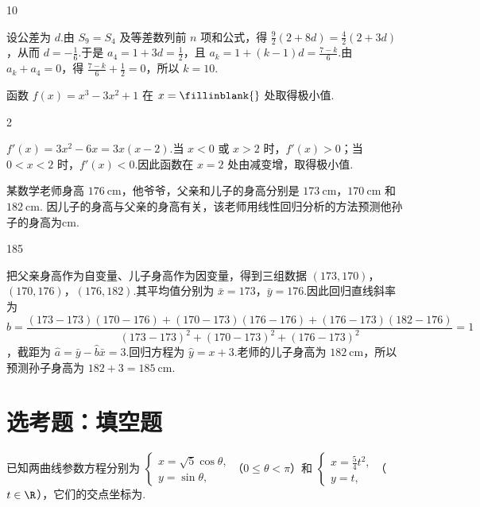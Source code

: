 \begin{answer}
10
\end{answer}

\begin{solution}
设公差为 \(d\).由 \(S_9=S_4\) 及等差数列前 \(n\) 项和公式，得 \(\frac{9}{2}(2+8d)=\frac{4}{2}(2+3d)\)，从而 \(d=-\frac{1}{6}\).于是 \(a_4=1+3d=\frac{1}{2}\)，且 \(a_k=1+(k-1)d=\frac{7-k}{6}\).由 \(a_k+a_4=0\)，得 \(\frac{7-k}{6}+\frac{1}{2}=0\)，所以 \(k=10\).
\end{solution}

\begin{problem}
函数 \( f(x) = x^3 - 3x^2 + 1 \) 在 \( x =\fillinblank{} \) 处取得极小值.
\end{problem}

\begin{answer}
2
\end{answer}

\begin{solution}
\(f'(x)=3x^2-6x=3x(x-2)\).当 \(x<0\) 或 \(x>2\) 时，\(f'(x)>0\)；当 \(0<x<2\) 时，\(f'(x)<0\).因此函数在 \(x=2\) 处由减变增，取得极小值.
\end{solution}

\begin{problem}
某数学老师身高 \(176\mathrm{~cm}\)，他爷爷，父亲和儿子的身高分别是 \(173\mathrm{~cm}\)，\(170\mathrm{~cm}\) 和 \(182\mathrm{~cm}\). 因儿子的身高与父亲的身高有关，该老师用线性回归分析的方法预测他孙子的身高为\fillinblank{}\(\mathrm{cm}\).
\end{problem}

\begin{answer}
185
\end{answer}

\begin{solution}
把父亲身高作为自变量、儿子身高作为因变量，得到三组数据 \((173,170)\)，\((170,176)\)，\((176,182)\).其平均值分别为 \(\bar x=173\)，\(\bar y=176\).因此回归直线斜率为
\(\hat b=\dfrac{(173-173)(170-176)+(170-173)(176-176)+(176-173)(182-176)}{(173-173)^2+(170-173)^2+(176-173)^2}=1\)，截距为 \(\hat a=\bar y-\hat b\bar x=3\).回归方程为 \(\hat y=x+3\).老师的儿子身高为 \(182\mathrm{~cm}\)，所以预测孙子身高为 \(182+3=185\mathrm{~cm}\).
\end{solution}

\section{选考题：填空题}

\begin{problem}
已知两曲线参数方程分别为 \(\begin{cases}
x = \sqrt{5} \cos \theta,\\
y = \sin \theta,
\end{cases}\)（\(0 \leqslant \theta < \pi\)）和 \(\begin{cases}
x = \frac{5}{4} t^2,\\
y = t,
\end{cases}\)（\(t \in \R\)），它们的交点坐标为\fillinblank{}.
\end{problem}

